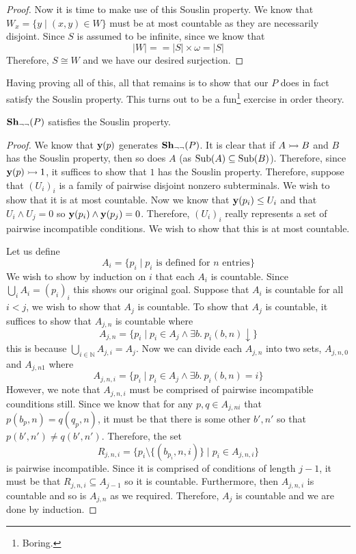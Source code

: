 \begin{proof}
  Now it is time to make use of this Souslin property. We know that
  $W_x = \{y \mid (x, y) \in W\}$ must be at most countable as they
  are necessarily disjoint. Since $S$ is assumed to be infinite, since
  we know that
  \[
    \left\vert W \right\vert = = \left\vert S \right\vert \times \omega
    = \left\vert S \right\vert
  \]
  Therefore, $S \cong W$ and we have our desired surjection.
\end{proof}

Having proving all of this, all that remains is to show that our $P$
does in fact satisfy the Souslin property. This turns out to be a
fun\footnote{Boring.} exercise in order theory.

\begin{lem}
  $\sheaves[\neg\neg]{P}$ satisfies the Souslin property.
\end{lem}
\begin{proof}
  We know that $\yoneda(p)$ generates $\sheaves[\neg\neg]{P}$. It is
  clear that if $A \mono B$ and $B$ has the Souslin property, then so
  does $A$ (as $\sub(A) \subseteq \sub(B)$). Therefore, since
  $\yoneda(p) \mono 1$, it suffices to show that $1$ has the Souslin
  property. Therefore, suppose that $(U_i)_i$ is a family of pairwise
  disjoint nonzero subterminals. We wish to show that it is at most
  countable. Now we know that $\yoneda(p_i) \le U_i$ and that
  $U_i \wedge U_j = 0$ so $\yoneda(p_i) \wedge \yoneda(p_j) =
  0$. Therefore, $(U_i)_i$ really represents a set of pairwise
  incompatible conditions. We wish to show that this is at most
  countable.

  Let us define
  \[
    A_i = \{p_i \mid p_i \text{ is defined for $n$ entries}\}
  \]
  We wish to show by induction on $i$ that each $A_i$ is
  countable. Since $\bigcup_i A_i = (p_i)_i$ this shows our original
  goal. Suppose that $A_i$ is countable for all $i < j$, we wish to
  show that $A_j$ is countable. To show that $A_j$ is countable, it
  suffices to show that $A_{j, n}$ is countable where
  \[
    A_{j, n} = \{p_i \mid p_i \in A_j \wedge \exists b.\ p_i(b, n) \downarrow\}
  \]
  this is because $\bigcup_{i \in \mathbb{N}} A_{j, i} = A_j$. Now we
  can divide each $A_{j, n}$ into two sets, $A_{j, n, 0}$ and $A_{j, n
    1}$ where
  \[
    A_{j, n, i } = \{p_i \mid p_i \in A_j \wedge \exists b.\ p_i(b, n) = i\}
  \]
  However, we note that  $A_{j, n, i}$ must be comprised of pairwise
  incompatible counditions still. Since we know that for any $p, q \in
  A_{j, n i}$ that $p(b_p, n) = q(q_p, n)$, it must be that there is
  some other $b', n'$ so that $p(b', n') \neq q(b', n')$. Therefore,
  the set
  \[
    R_{j, n, i } = \{p_i \setminus \{(b_{p_i}, n, i)\} \mid p_i \in A_{j, n, i}\}
  \]
  is pairwise incompatible. Since it is comprised of conditions of
  length $j - 1$, it must be that $R_{j, n, i} \subseteq A_{j - 1}$ so
  it is countable. Furthermore, then $A_{j, n, i}$ is countable and so
  is $A_{j, n}$ as we required. Therefore, $A_j$ is countable and we
  are done by induction.
\end{proof}
